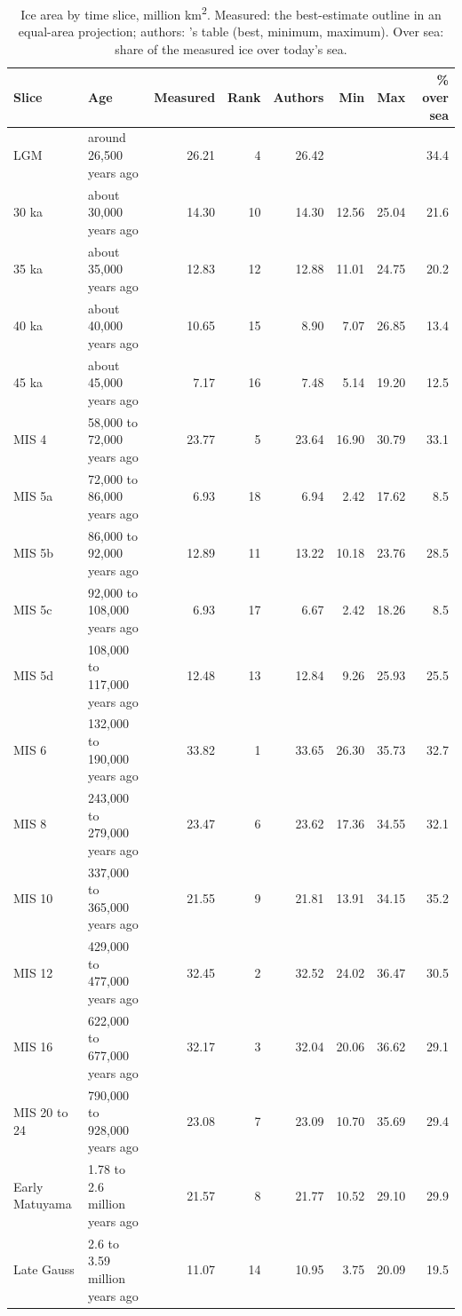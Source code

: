 \documentclass[11pt,a4paper]{article}
\newcommand{\kmq}{km\textsuperscript{2}}
\begin{document}
\begin{table}[tbp]\centering\footnotesize\setlength{\tabcolsep}{4pt}\caption{Ice area by time slice, million \kmq. Measured: the best-estimate outline in an equal-area projection; authors: \citet{batchelor}'s table (best, minimum, maximum). Over sea: share of the measured ice over today's sea.}\label{tab:areas}\begin{tabular}{llrrrrrr}\toprule Slice & Age & Measured & Rank & Authors & Min & Max & \% over sea\\\midrule
LGM & around 26,500 years ago & 26.21 & 4 & 26.42 &  &  & 34.4\\
30 ka & about 30,000 years ago & 14.30 & 10 & 14.30 & 12.56 & 25.04 & 21.6\\
35 ka & about 35,000 years ago & 12.83 & 12 & 12.88 & 11.01 & 24.75 & 20.2\\
40 ka & about 40,000 years ago & 10.65 & 15 & 8.90 & 7.07 & 26.85 & 13.4\\
45 ka & about 45,000 years ago & 7.17 & 16 & 7.48 & 5.14 & 19.20 & 12.5\\
MIS 4 & 58,000 to 72,000 years ago & 23.77 & 5 & 23.64 & 16.90 & 30.79 & 33.1\\
MIS 5a & 72,000 to 86,000 years ago & 6.93 & 18 & 6.94 & 2.42 & 17.62 & 8.5\\
MIS 5b & 86,000 to 92,000 years ago & 12.89 & 11 & 13.22 & 10.18 & 23.76 & 28.5\\
MIS 5c & 92,000 to 108,000 years ago & 6.93 & 17 & 6.67 & 2.42 & 18.26 & 8.5\\
MIS 5d & 108,000 to 117,000 years ago & 12.48 & 13 & 12.84 & 9.26 & 25.93 & 25.5\\
MIS 6 & 132,000 to 190,000 years ago & 33.82 & 1 & 33.65 & 26.30 & 35.73 & 32.7\\
MIS 8 & 243,000 to 279,000 years ago & 23.47 & 6 & 23.62 & 17.36 & 34.55 & 32.1\\
MIS 10 & 337,000 to 365,000 years ago & 21.55 & 9 & 21.81 & 13.91 & 34.15 & 35.2\\
MIS 12 & 429,000 to 477,000 years ago & 32.45 & 2 & 32.52 & 24.02 & 36.47 & 30.5\\
MIS 16 & 622,000 to 677,000 years ago & 32.17 & 3 & 32.04 & 20.06 & 36.62 & 29.1\\
MIS 20 to 24 & 790,000 to 928,000 years ago & 23.08 & 7 & 23.09 & 10.70 & 35.69 & 29.4\\
Early Matuyama & 1.78 to 2.6 million years ago & 21.57 & 8 & 21.77 & 10.52 & 29.10 & 29.9\\
Late Gauss & 2.6 to 3.59 million years ago & 11.07 & 14 & 10.95 & 3.75 & 20.09 & 19.5\\
\bottomrule\end{tabular}\end{table}
\end{document}
